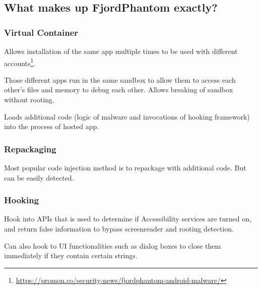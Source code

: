 \label{task:20240517_android}

\subsection{What makes up FjordPhantom exactly?}

\subsubsection{Virtual Container}

Allows installation of the same app multiple times to be used with different accounts\footnote{\url{https://promon.co/security-news/fjordphantom-android-malware/}}. 

Those different apps run in the same sandbox to allow them to access each other's files and memory to debug each other. Allows breaking of sandbox without rooting.

Loads additional code (logic of malware and invocations of hooking framework) into the process of hosted app.

\subsubsection{Repackaging}

Most popular code injection method is to repackage with additional code. But can be easily detected.

\subsubsection{Hooking}

Hook into APIs that is used to determine if Accessibility services are turned on, and return false information to bypass screenreader and rooting detection.

Can also hook to UI functionalities such as dialog boxes to close them immediately if they contain certain strings.


